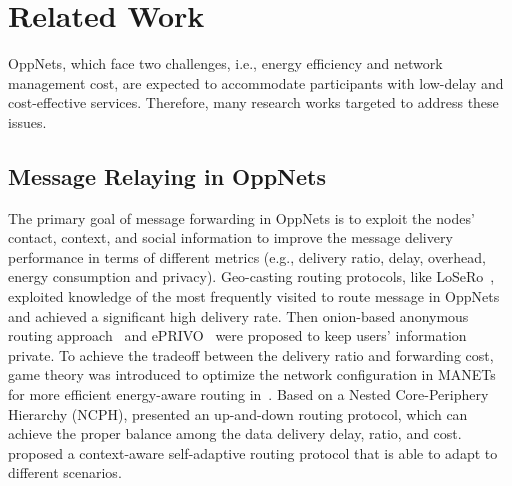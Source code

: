 \section{Related Work}
\label{sec:related}
OppNets, which face two challenges,
i.e., energy efficiency and network management cost,
are expected to accommodate participants
with low-delay and cost-effective services.
Therefore, many research works targeted to address these issues.

\subsection{Message Relaying in OppNets}
The primary goal of message forwarding in OppNets
is to exploit the nodes' contact, context,
and social information to improve
the message delivery performance
in terms of different metrics (e.g.,
delivery ratio, delay, overhead,
energy consumption and privacy).
Geo-casting routing protocols, like 
LoSeRo~\cite{DBLP:journals/tmc/CostantinoMMS20},
exploited knowledge of the most frequently visited
to route message in OppNets
and achieved a significant high delivery rate.
Then onion-based anonymous routing
approach~\cite{DBLP:conf/icdcs/SakaiSKWA16}
and ePRIVO~\cite{DBLP:journals/tvt/MagaiaBPC18} were 
proposed to keep users' information private.
To achieve the tradeoff between the delivery ratio
and forwarding cost,
game theory was introduced to
optimize the network configuration in MANETs
for more efficient energy-aware routing
in~\cite{DBLP:journals/monet/MaoZ15}.
Based on a Nested Core-Periphery Hierarchy (NCPH),
\cite{DBLP:journals/tvt/Zheng017} presented
an up-and-down routing protocol,
which can achieve the proper balance
among the data delivery delay, ratio, and cost.
\cite{DBLP:journals/adhoc/RosasGH20} proposed
a context-aware self-adaptive routing protocol
that is able to adapt to different scenarios.

